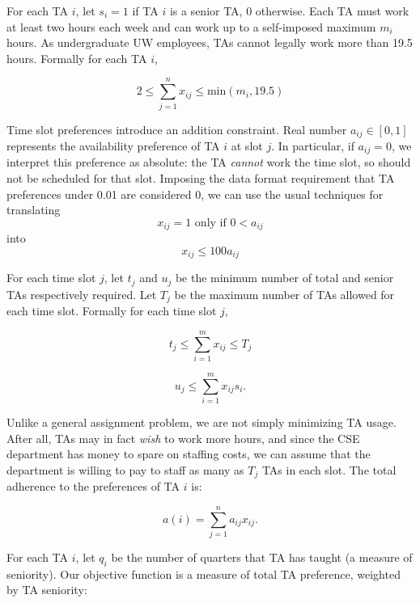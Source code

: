 \documentclass{article}
\begin{document}
\begin{multicols}{2}
For each TA $i$, let $s_i = 1$ if TA $i$ is a senior TA, 0 otherwise. Each TA must work at least two hours each week and can work up to a self-imposed maximum $m_i$ hours. As undergraduate UW employees, TAs cannot legally work more than 19.5 hours. Formally for each TA $i$,

\begin{equation}
2 \leq \sum_{j=1}^{n}x_{ij} \leq \textrm{min}(m_i, 19.5)
\end{equation}

Time slot preferences introduce an addition constraint. Real number $a_{ij} \in [0,1]$ represents the availability preference of TA $i$ at slot $j$. In particular, if $a_{ij} = 0$, we interpret this preference as absolute: the TA \textit{cannot} work the time slot, so should not be scheduled for that slot. Imposing the data format requirement that TA preferences under 0.01 are considered 0, we can use the usual techniques for translating
\begin{equation}
x_{ij} = 1 \textrm{ only if } 0 < a_{ij}
\end{equation}
into
\begin{equation}
x_{ij} \leq 100 a_{ij}
\end{equation}

For each time slot $j$, let $t_j$ and $u_j$ be the minimum number of total and senior TAs respectively required. Let $T_j$ be the maximum number of TAs allowed for each time slot. Formally for each time slot $j$,

\begin{equation}
t_j \leq \sum_{i=1}^{m}x_{ij} \leq T_j
\end{equation}

\begin{equation}
u_j \leq \sum_{i=1}^{m}x_{ij}s_i.
\end{equation}

Unlike a general assignment problem, we are not simply minimizing TA usage. After all, TAs may in fact \textit{wish} to work more hours, and since the CSE department has money to spare on staffing costs, we can assume that the department is willing to pay to staff as many as $T_j$ TAs in each slot. The total adherence to the preferences of TA $i$ is:

\begin{equation}
a(i) = \sum_{j=1}^na_{ij}x_{ij}.
\end{equation}

For each TA $i$, let $q_i$ be the number of quarters that TA has taught (a measure of seniority). Our objective function is a measure of total TA preference, weighted by TA seniority:


\end{multicols}
\end{document}
